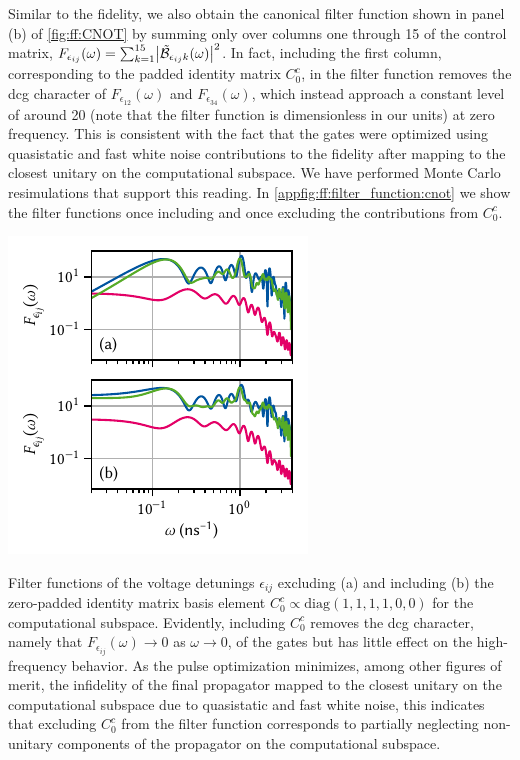 Similar to the fidelity, we also obtain the canonical filter function shown in panel (b) of \cref{fig:ff:CNOT} by summing only over columns one through 15 of the control matrix, $F_{\epsilon_{ij}}(\omega) = \sum_{k=1}^{15}\bigl\lvert\tilde{\mathcal{B}}_{\epsilon_{ij} k}(\omega)\bigr\rvert^2$.
In fact, including the first column, corresponding to the padded identity matrix $C_0^c$, in the filter function removes the \gls{dcg} character of $F_{\epsilon_{12}}(\omega)$ and $F_{\epsilon_{34}}(\omega)$, which instead approach a constant level of around 20 (note that the filter function is dimensionless in our units) at zero frequency.
This is consistent with the fact that the gates were optimized using quasistatic and fast white noise contributions to the fidelity after mapping to the closest unitary on the computational subspace.
We have performed Monte Carlo resimulations that support this reading.
In \cref{appfig:ff:filter_function:cnot} we show the filter functions once including and once excluding the contributions from $C_0^c$.

\begin{marginfigure}
    \centering
    \includegraphics{img/pdf/filter_functions/CNOT_FF_unitary_v_complete}
    \caption[]{
        Filter functions of the voltage detunings $\epsilon_{ij}$ excluding (a) and including (b) the zero-padded identity matrix basis element $C_0^c\propto\text{diag}(1,1,1,1,0,0)$ for the computational subspace.
        Evidently, including $C_0^c$ removes the \gls{dcg} character, namely that $F_{\epsilon_{ij}}(\omega)\rightarrow 0$ as $\omega\rightarrow 0$, of the gates but has little effect on the high-frequency behavior.
        As the pulse optimization minimizes, among other figures of merit, the infidelity of the final propagator mapped to the closest unitary on the computational subspace due to quasistatic and fast white noise, this indicates that excluding $C_0^c$ from the filter function corresponds to partially neglecting non-unitary components of the propagator on the computational subspace.
}
    \label{appfig:ff:filter_function:cnot}
\end{marginfigure}

